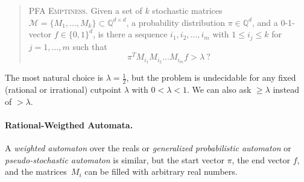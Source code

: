 \documentclass[a4paper,cleveref, autoref, thm-restate]{lipics-v2021}
\newcommand\eeta{f} %
\begin{document}
\goodbreak

\begin{quote}
  \textsc{PFA Emptiness.}
  Given  a %
  set of $k$ %
  stochastic matrices
 $\mathcal{M}=\{M_1,\ldots,M_k\} \subset  \mathbb Q^{d\times d}$,
a probability distribution $\pi\in \mathbb Q^d$,
and a 0-1-vector $\eeta \in \{0,1\}^{d}$, 
is there a sequence
$i_1,i_2,\ldots, i_m$
with $1\le i_j\le k$ for $j=1,\ldots,m$
such that
\begin{equation}\label{eq:accept}
  \pi^T\!M_{i_1}M_{i_2}\ldots M_{i_m}\eeta > \lambda \ ?
\end{equation}
\goodbreak
\end{quote}
The most natural choice is $\lambda=\frac12$, but
the problem is undecidable for
any fixed (rational or irrational) cutpoint $\lambda$ with $0<
\lambda< 1$.  We can also ask $\ge\lambda$ instead of $>\lambda$.

\paragraph{Rational-Weigthed Automata.}
A \emph{weighted automaton} over the reals or
\emph{generalized probabilistic automaton} or
\emph{pseudo-stochastic automaton}
is similar, but
the start vector $\pi$, the end vector $f$, and
the matrices~$M_i$ can be filled with arbitrary real numbers.
\end{document}
